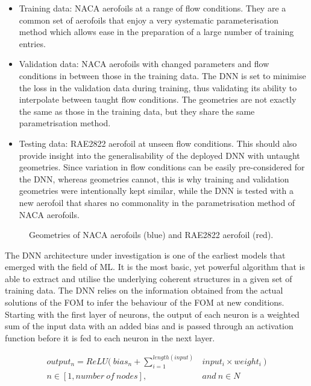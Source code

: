 \documentclass[11pt]{article}
\begin{document}
\begin{itemize}
    \item Training data: NACA aerofoils at a range of flow conditions. They are a common set of aerofoils that enjoy a very systematic parameterisation method which allows ease in the preparation of a large number of training entries.
    \item Validation data: NACA aerofoils with changed parameters and flow conditions in between those in the training data. The DNN is set to minimise the loss in the validation data during training, thus validating its ability to interpolate between taught flow conditions. The geometries are not exactly the same as those in the training data, but they share the same parametrisation method.
    \item Testing data: RAE2822 aerofoil at unseen flow conditions. This should also provide insight into the generalisability of the deployed DNN with untaught geometries. Since variation in flow conditions can be easily pre-considered for the DNN, whereas geometries cannot, this is why training and validation geometries were intentionally kept similar, while the DNN is tested with a new aerofoil that shares no commonality in the parametrisation method of NACA aerofoils.
\end{itemize}

\begin{figure}[htbp]
    \centering
    
    \caption{Geometries of NACA aerofoils (blue) and RAE2822 aerofoil (red).}
\end{figure}

The DNN architecture under investigation is one of the earliest models that emerged with the field of ML. It is the most basic, yet powerful algorithm that is able to extract and utilise the underlying coherent structures in a given set of training data. The DNN relies on the information obtained from the actual solutions of the FOM to infer the behaviour of the FOM at new conditions. Starting with the first layer of neurons, the output of each neuron is a weighted sum of the input data with an added bias and is passed through an activation function before it is fed to each neuron in the next layer.

\begin{equation}
	\label{eqn:Example}
	\begin{split}
        output_n = ReLU(~ bias_n + \sum_{i=1}^{length(input)} & input_i \times weight_i ~) \\
		n \in [1, number~of~nodes], ~& and ~ n \in N
	\end{split}
\end{equation}
\end{document}
